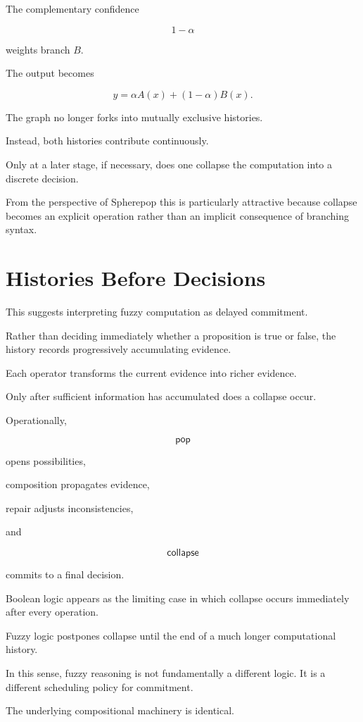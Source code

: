 \documentclass[12pt,oneside]{article}
\newcommand{\Pop}{\mathsf{pop}}
\newcommand{\Collapse}{\mathsf{collapse}}
\begin{document}
The complementary confidence

\[
1-\alpha
\]

weights branch \(B\).

The output becomes

\[
y
=
\alpha A(x)
+
(1-\alpha)B(x).
\]

The graph no longer forks into mutually exclusive histories.

Instead, both histories contribute continuously.

Only at a later stage, if necessary, does one collapse the computation into a discrete decision.

From the perspective of Spherepop this is particularly attractive because collapse becomes an explicit operation rather than an implicit consequence of branching syntax.

\section{Histories Before Decisions}

This suggests interpreting fuzzy computation as delayed commitment.

Rather than deciding immediately whether a proposition is true or false, the history records progressively accumulating evidence.

Each operator transforms the current evidence into richer evidence.

Only after sufficient information has accumulated does a collapse occur.

Operationally,

\[
\Pop
\]

opens possibilities,

composition propagates evidence,

repair adjusts inconsistencies,

and

\[
\Collapse
\]

commits to a final decision.

Boolean logic appears as the limiting case in which collapse occurs immediately after every operation.

Fuzzy logic postpones collapse until the end of a much longer computational history.

In this sense, fuzzy reasoning is not fundamentally a different logic. It is a different scheduling policy for commitment.

The underlying compositional machinery is identical.
\end{document}
